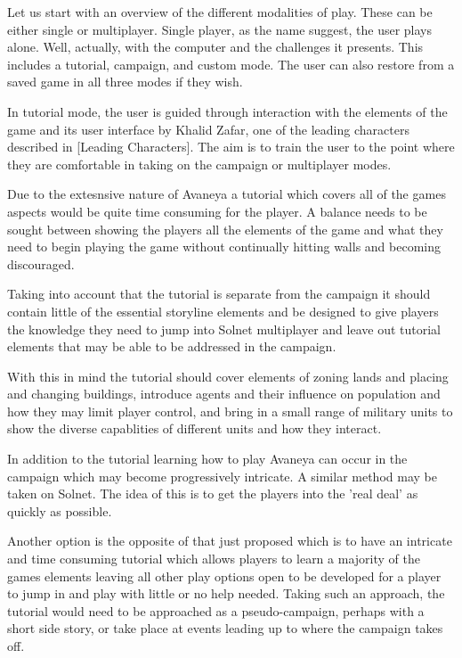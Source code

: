 
Let us start with an overview of the different modalities of play. These can be either single or multiplayer. Single player, as the name suggest, the user plays alone. Well, actually, with the computer and the challenges it presents. This includes a tutorial, campaign, and custom mode. The user can also restore from a saved game in all three modes if they wish.



In tutorial mode, the user is guided through interaction with the elements of the game and its user interface by Khalid Zafar, one of the leading characters described in [Leading Characters]. The aim is to train the user to the point where they are comfortable in taking on the campaign or multiplayer modes.

Due to the extesnsive nature of Avaneya a tutorial which covers all of the games aspects would be quite time consuming for the player. A balance needs to be sought between showing the players all the elements of the game and what they need to begin playing the game without continually hitting walls and becoming discouraged.   

Taking into account that the tutorial is separate from the campaign it should contain little of the essential storyline elements and be designed to give players the knowledge they need to jump into Solnet multiplayer and leave out tutorial elements that may be able to be addressed in the campaign.  

With this in mind the tutorial should cover elements of zoning lands and placing and changing buildings, introduce agents and their influence on population and how they may limit player control, and bring in a small range of military units to show the diverse capablities of different units and how they interact. %

In addition to the tutorial learning how to play Avaneya can occur in the campaign which may become progressively intricate. A similar method may be taken on Solnet. The idea of this is to get the players into the 'real deal' as quickly as possible.

Another option is the opposite of that just proposed which is to have an intricate and time consuming tutorial which allows players to learn a majority of the games elements leaving all other play options open to be developed for a player to jump in and play with little or no help needed. Taking such an approach, the tutorial would need to be approached as a pseudo-campaign, perhaps with a short side story, or take place at events leading up to where the campaign takes off.  	 



